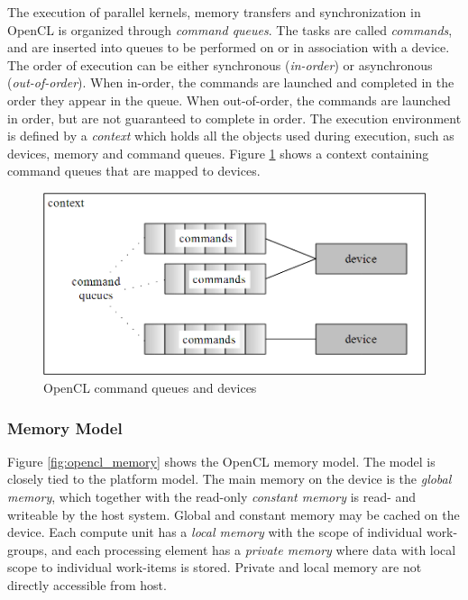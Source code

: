 		The execution of parallel kernels, memory transfers and synchronization in OpenCL is organized through \emph{command queues}. The tasks are called \emph{commands}, and are inserted into queues to be performed on or in association with a device. The order of execution can be either synchronous (\emph{in-order}) or asynchronous (\emph{out-of-order}). When in-order, the commands are launched and completed in the order they appear in the queue. When out-of-order, the commands are launched in order, but are not guaranteed to complete in order. The execution environment is defined by a \emph{context} which holds all the objects used during execution, such as devices, memory and command queues. Figure \ref{fig:command_queues} shows a context containing command queues that are mapped to devices.
		
		\begin{figure}[h]
		\centering
		\includegraphics[height=0.25\textheight]{graphics/command_queues.png}
		\caption{OpenCL command queues and devices}
		\label{fig:command_queues}
		\end{figure}
	
	\subsubsection{Memory Model}
	
		Figure \ref{fig:opencl_memory} shows the OpenCL memory model. The model is closely tied to the platform model. The main memory on the device is the \emph{global memory}, which together with the read-only \emph{constant memory} is read- and writeable by the host system. Global and constant memory may be cached on the device. Each compute unit has a \emph{local memory} with the scope of individual work-groups, and each processing element has a \emph{private memory} where data with local scope to individual work-items is stored. Private and local memory are not directly accessible from host.
	
